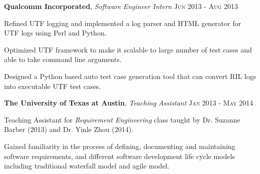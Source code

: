 \documentclass[a4paper,11pt]{article}
\begin{document}
\begin{comment}
\textbf{The University of Texas at Austin}, \emph{Graduate Research Assistant} \hfill \textsc{Aug 2013 - Jan 2014}\vspace{-10pt}\\
\begin{itemize}[noitemsep,topsep=0pt,parsep=0pt,partopsep=0pt,leftmargin=*]\vspace{-5pt}
\small{
  \item Conducted research for the impact of different compiler optimizations on symbolic execution under the supervision of Dr. Sarfraz Khurshid.
}
\end{itemize}
\end{comment}

\textbf{Qualcomm Incorporated}, \emph{Software Engineer Intern} \hfill\textsc{Jun 2013 - Aug 2013}\vspace{-10pt} \\
\begin{itemize}[noitemsep,topsep=0pt,parsep=0pt,partopsep=0pt,leftmargin=*]\vspace{-5pt}
\small{
  \item Refined UTF logging and implemented a log parser and HTML generator for UTF logs using Perl and Python.
  \item Optimized UTF framework to make it scalable to large number of test cases and able to take command line arguments.
  \item Designed a Python based auto test case generation tool that can convert RIL logs into executable UTF test cases.
}
\end{itemize}

\textbf{The University of Texas at Austin}, \emph{Teaching Assistant} \hfill\textsc{Jan 2013 - May 2014}\vspace{-10pt}\\
\begin{itemize}[noitemsep,topsep=0pt,parsep=0pt,partopsep=0pt,leftmargin=*]\vspace{-5pt}
\small{
  \item Teaching Assistant for \textit{Requirement Engineering} class taught by Dr. Suzanne Barber (2013) and Dr. Yinle Zhou (2014).
  \item Gained familiarity in the process of defining, documenting and maintaining software requirements, and different software development life cycle models including traditional waterfall model and agile model.
}
\end{itemize}
\end{document}
